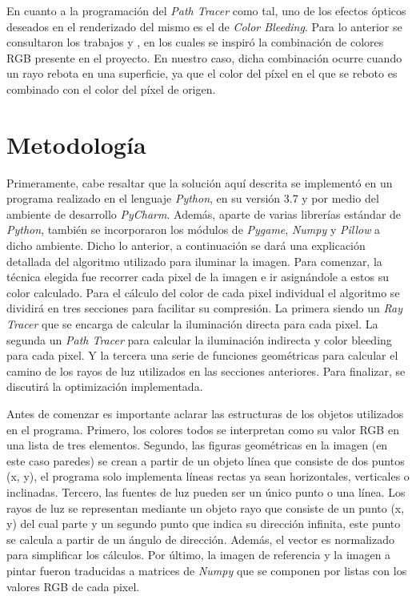 \documentclass[conference]{IEEEtran}
\begin{document}
En cuanto a la programación del \textit{Path Tracer} como tal, uno de los efectos ópticos deseados en el renderizado del mismo es el de \textit{Color Bleeding}. Para lo anterior se consultaron los trabajos \cite{b4} y \cite{b5}, en los cuales se inspiró la combinación de colores RGB presente en el proyecto. En nuestro caso, dicha combinación ocurre cuando un rayo rebota en una superficie, ya que el color del píxel en el que se reboto es combinado con el color del píxel de origen.

\section{Metodología}
Primeramente, cabe resaltar que la solución aquí descrita se implementó en un programa realizado en el lenguaje \textit{Python}, en su versión 3.7 y por medio del ambiente de desarrollo \textit{PyCharm}. Además, aparte de varias librerías estándar de \textit{Python}, también se incorporaron los módulos de \textit{Pygame}, \textit{Numpy} y \textit{Pillow} a dicho ambiente. Dicho lo anterior, a continuación se dará una explicación detallada del algoritmo utilizado para iluminar la imagen. Para comenzar, la técnica elegida fue recorrer cada pixel de la imagen e ir asignándole a estos su color calculado. Para el cálculo del color de cada pixel individual el algoritmo se dividirá en tres secciones para facilitar su compresión. La primera siendo un \textit{Ray Tracer} que se encarga de calcular la iluminación directa para cada pixel. La segunda un \textit{Path Tracer} para calcular la iluminación indirecta y color bleeding para cada pixel. Y la tercera una serie de funciones geométricas para calcular el camino de los rayos de luz utilizados en las secciones anteriores. Para finalizar, se discutirá la optimización implementada. 

Antes de comenzar es importante aclarar las estructuras de los objetos utilizados en el programa. Primero, los colores todos se interpretan como su valor RGB en una lista de tres elementos. Segundo, las figuras geométricas en la imagen (en este caso paredes) se crean a partir de un objeto línea que consiste de dos puntos (x, y), el programa solo implementa líneas rectas ya sean horizontales, verticales o inclinadas. Tercero, las fuentes de luz pueden ser un único punto o una línea. Los rayos de luz se representan mediante un objeto rayo que consiste de un punto (x, y) del cual parte y un segundo punto que indica su dirección infinita, este punto se calcula a partir de un ángulo de dirección. Además, el vector es normalizado para simplificar los cálculos. Por último, la imagen de referencia y la imagen a pintar fueron traducidas a matrices de \textit{Numpy} que se componen por listas con los valores RGB de cada pixel. 
\end{document}

